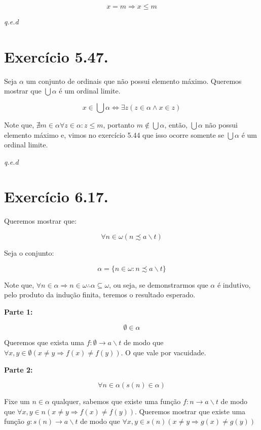 \documentclass[12pt]{extarticle}
\newcommand{\fim}{\begin{flushright}

   \emph{q.e.d}
\end{flushright}}
\begin{document}
$$
x = m \Rightarrow x \leq m
$$

\fim

\section{Exercício 5.47.}

Seja $\alpha$ um conjunto de ordinais que não possui elemento máximo. Queremos mostrar que $\bigcup \alpha$ é um ordinal limite.

$$
x \in \bigcup \alpha \Leftrightarrow \exists z (z \in \alpha \land x \in z)
$$

Note que, $\nexists m \in \alpha \forall z \in \alpha   : z \leq m$, portanto $m \notin \bigcup \alpha$, então, $\bigcup \alpha$ não possui elemento máximo e, vimos no exercício 5.44 que isso ocorre somente se $\bigcup \alpha$ é um ordinal limite.  

\fim

\section{Exercício 6.17.}

Queremos mostrar que:

$$
\forall n \in \omega (n \precsim a  \backslash t)
$$

Seja o conjunto:

$$
\alpha = \{n \in \omega : n \precsim a  \backslash t\}
$$

Note que, $\forall n \in \alpha \Rightarrow n \in \omega \therefore \alpha \subseteq \omega$, ou seja, se demonstrarmos que $\alpha$ é indutivo, pelo produto da indução finita, teremos o resultado esperado.

\textbf{Parte 1:}

$$
\emptyset \in \alpha
$$

Queremos que exista uma $f:\emptyset \rightarrow a \backslash t$ de modo que $\forall x,y \in \emptyset (x \neq y \Rightarrow f(x) \neq f(y))$. O que vale por vacuidade.

\textbf{Parte 2:}

$$
\forall n \in \alpha (s(n) \in \alpha)
$$

Fixe um $n \in \alpha$ qualquer, sabemos que existe uma função $f: n \rightarrow a \backslash t$ de modo que $\forall x, y \in n (x \neq y \Rightarrow f(x) \neq f(y))$. Queremos mostrar que existe uma função $g: s(n) \rightarrow a \backslash t$ de modo que $\forall x, y \in s(n) (x \neq y \Rightarrow g(x) \neq g(y))$
\end{document}

